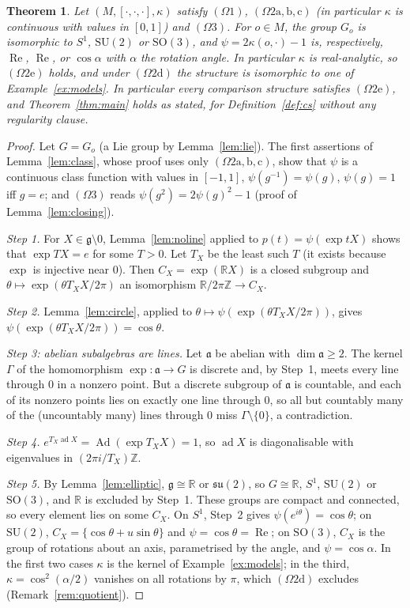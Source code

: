 \documentclass[11pt,reqno]{amsart}
\newtheorem{theorem}{Theorem}[section]
\theoremstyle{definition}
\theoremstyle{remark}
\numberwithin{equation}{section}
\newcommand{\R}{\mathbb{R}}
\newcommand{\Z}{\mathbb{Z}}
\newcommand{\g}{\mathfrak{g}}
\newcommand{\su}{\mathfrak{su}}
\newcommand{\Ad}{\operatorname{Ad}}
\newcommand{\ad}{\operatorname{ad}}
\newcommand{\re}{\operatorname{Re}}
\newcommand{\hp}[3]{[#1,#2,#3]}
\newcommand{\SU}{\mathrm{SU}}
\newcommand{\SO}{\mathrm{SO}}
\begin{document}
\begin{theorem}\label{thm:noreg}
Let $(M,\hp\cdot\cdot\cdot,\kappa)$ satisfy $(\Omega1)$, $(\Omega2\mathrm{a,b,c})$ (in particular $\kappa$ is continuous with
values in $[0,1]$) and $(\Omega3)$.  For $o\in M$, the group $G_o$ is isomorphic to $S^1$, $\SU(2)$ or $\SO(3)$, and
$\psi=2\kappa(o,\cdot)-1$ is, respectively, $\re$, $\re$, or $\cos\alpha$ with $\alpha$ the rotation angle.  In particular
$\kappa$ is real-analytic, so $(\Omega2\mathrm e)$ holds, and under $(\Omega2\mathrm d)$ the structure is isomorphic to one of
Example~\ref{ex:models}.  In particular every comparison structure satisfies $(\Omega2\mathrm e)$, and Theorem~\ref{thm:main} holds
as stated, for Definition~\ref{def:cs} without any regularity clause.
\end{theorem}
\begin{proof}
Let $G=G_o$ (a Lie group by Lemma~\ref{lem:lie}).  The first assertions of Lemma~\ref{lem:class}, whose proof uses only
$(\Omega2\mathrm{a,b,c})$, show that $\psi$ is a continuous class function with values in $[-1,1]$, $\psi(g^{-1})=\psi(g)$,
$\psi(g)=1$ iff $g=e$; and $(\Omega3)$ reads $\psi(g^2)=2\psi(g)^2-1$ (proof of Lemma~\ref{lem:closing}).

\emph{Step 1.}  For $X\in\g\setminus0$, Lemma~\ref{lem:noline} applied to $p(t)=\psi(\exp tX)$ shows that $\exp T X=e$ for some
$T>0$.  Let $T_X$ be the least such $T$ (it exists because $\exp$ is injective near $0$).  Then $C_X=\exp(\R X)$ is a closed
subgroup and $\theta\mapsto\exp(\theta T_XX/2\pi)$ an isomorphism $\R/2\pi\Z\to C_X$.

\emph{Step 2.}  Lemma~\ref{lem:circle}, applied to $\theta\mapsto\psi(\exp(\theta T_XX/2\pi))$, gives
$\psi(\exp(\theta T_XX/2\pi))=\cos\theta$.

\emph{Step 3: abelian subalgebras are lines.}  Let $\mathfrak a$ be abelian with $\dim\mathfrak a\ge2$.  The kernel $\Gamma$ of
the homomorphism $\exp\colon\mathfrak a\to G$ is discrete and, by Step~1, meets every line through $0$ in a nonzero point.
But a discrete subgroup of $\mathfrak a$ is countable, and each of its nonzero points lies on exactly one line through $0$,
so all but countably many of the (uncountably many) lines through $0$ miss $\Gamma\setminus\{0\}$, a contradiction.

\emph{Step 4.}  $e^{T_X\ad X}=\Ad(\exp T_XX)=1$, so $\ad X$ is diagonalisable with eigenvalues in $(2\pi i/T_X)\Z$.

\emph{Step 5.}  By Lemma~\ref{lem:elliptic}, $\g\cong\R$ or $\su(2)$, so $G\cong\R$, $S^1$, $\SU(2)$ or $\SO(3)$, and $\R$ is
excluded by Step~1.  These groups are compact and connected, so every element lies on some $C_X$.  On $S^1$, Step~2 gives
$\psi(e^{i\theta})=\cos\theta$; on $\SU(2)$, $C_X=\{\cos\theta+u\sin\theta\}$ and $\psi=\cos\theta=\re$; on $\SO(3)$, $C_X$ is the
group of rotations about an axis, parametrised by the angle, and $\psi=\cos\alpha$.  In the first two cases $\kappa$ is the
kernel of Example~\ref{ex:models}; in the third, $\kappa=\cos^2(\alpha/2)$ vanishes on all rotations by $\pi$, which
$(\Omega2\mathrm d)$ excludes (Remark~\ref{rem:quotient}).
\end{proof}
\end{document}
